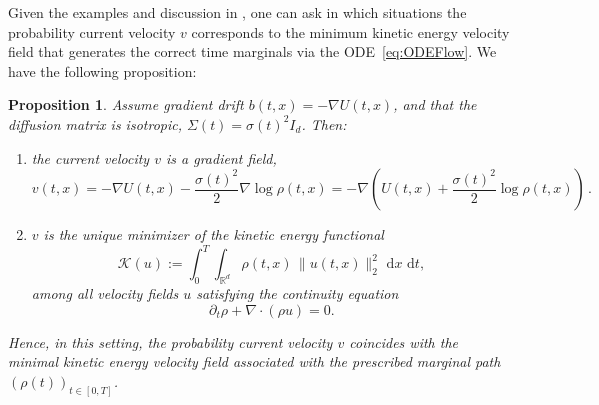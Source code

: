 \documentclass[oneside,11pt]{article}
\newtheorem{proposition}{Proposition}
\theoremstyle{remark}
\begin{document}
Given the examples and discussion in , one can ask in which situations the probability current velocity $v$ corresponds to the minimum kinetic energy velocity field that generates the correct time marginals via the ODE~\eqref{eq:ODEFlow}. We have the following proposition:

\begin{proposition}
Assume gradient drift $b(t,x) = -\nabla U(t,x)$, and that the diffusion matrix is isotropic, $\Sigma(t) = \sigma(t)^2 I_d$.
Then:
\begin{enumerate}
    \item the current velocity \(v\) is a gradient field,
    \begin{equation*}
        v(t,x)
        = -\nabla U(t,x) - \frac{\sigma(t)^2}{2}\nabla \log \rho(t,x)
        = -\nabla\!\left(U(t,x) + \frac{\sigma(t)^2}{2}\log \rho(t,x)\right)\,.
    \end{equation*}
    \item \(v\) is the unique minimizer of the kinetic energy functional
    \begin{equation*}
        \mathcal{K}(u)
        :=
        \int_0^T \int_{\mathbb{R}^d} \rho(t,x)\,\|u(t,x)\|^2_2 \,\,\mathrm{d} x\,\,\mathrm{d} t,
    \end{equation*}
    among all velocity fields \(u\) satisfying the continuity equation
    \begin{equation*}
        \partial_t \rho + \nabla \cdot (\rho u) = 0.
    \end{equation*}
\end{enumerate}
Hence, in this setting, the probability current velocity \(v\) coincides with the minimal kinetic energy velocity field associated with the prescribed marginal path \((\rho(t))_{t\in[0,T]}\).
\end{proposition}
\end{document}
